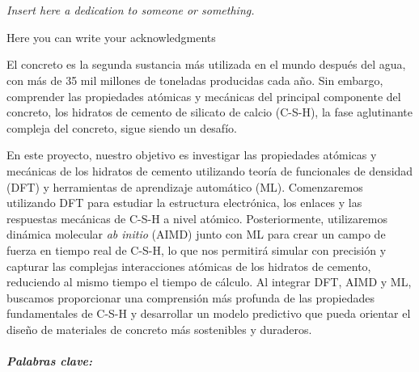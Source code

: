 \documentclass[12pt, titlepage, twoside, openright, usernames, dvipsnames]{thesis}
\theoremstyle{definition}
\theoremstyle{definition}
\begin{document}
\let\cleardoublepage\clearpage
%
%

\chapter*{}
  \begin{center}
\fontsize{12}{15}\selectfont \textit{Insert here a dedication to someone or something.}
\vfill
  \end{center}


\begin{acknowledgements}
Here you can write your acknowledgments 
\end{acknowledgements}

\begin{Resumen}
El concreto es la segunda sustancia más utilizada en el mundo después del agua, con más de 35 mil millones de toneladas producidas cada año. Sin embargo, comprender las propiedades atómicas y mecánicas del principal componente del concreto, los hidratos de cemento de silicato de calcio (C-S-H), la fase aglutinante compleja del concreto, sigue siendo un desafío.

En este proyecto, nuestro objetivo es investigar las propiedades atómicas y mecánicas de los hidratos de cemento utilizando teoría de funcionales de densidad (DFT) y herramientas de aprendizaje automático (ML). Comenzaremos utilizando DFT para estudiar la estructura electrónica, los enlaces y las respuestas mecánicas de C-S-H a nivel atómico. Posteriormente, utilizaremos dinámica molecular \emph{ab initio} (AIMD) junto con ML para crear un campo de fuerza en tiempo real de C-S-H, lo que nos permitirá simular con precisión y capturar las complejas interacciones atómicas de los hidratos de cemento, reduciendo al mismo tiempo el tiempo de cálculo. Al integrar DFT, AIMD y ML, buscamos proporcionar una comprensión más profunda de las propiedades fundamentales de C-S-H y desarrollar un modelo predictivo que pueda orientar el diseño de materiales de concreto más sostenibles y duraderos. 
 \\
 \\
 \emph{\textbf{Palabras clave:}}
\end{Resumen}
\end{document}
